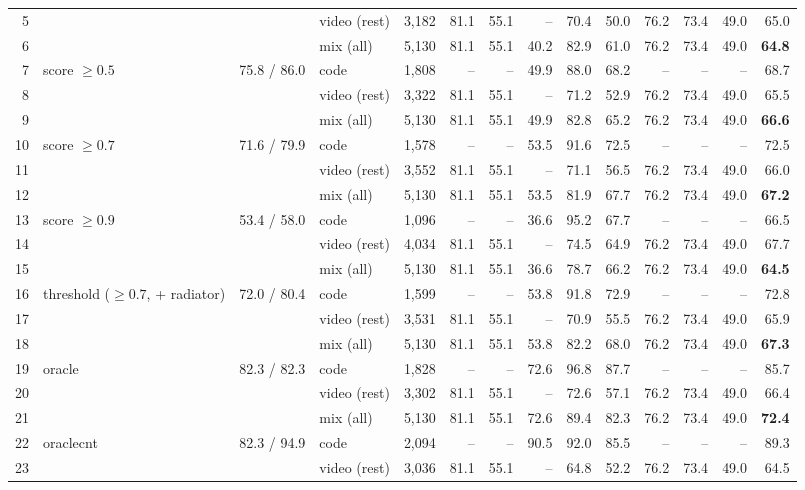 \begin{table}[h]
{\begin{tabular}{rlrlrrrrrrrrrr}
5 &  &  & video (rest) & 3,182 & 81.1 & 55.1 & -- & 70.4 & 50.0 & 76.2 & 73.4 & 49.0 & 65.0 \\
6 &  &  & mix (all) & 5,130 & 81.1 & 55.1 & 40.2 & 82.9 & 61.0 & 76.2 & 73.4 & 49.0 & \textbf{64.8} \\
7 & score $\geq 0.5$ & 75.8 / 86.0 & code & 1,808 & -- & -- & 49.9 & 88.0 & 68.2 & -- & -- & -- & 68.7 \\
8 &  &  & video (rest) & 3,322 & 81.1 & 55.1 & -- & 71.2 & 52.9 & 76.2 & 73.4 & 49.0 & 65.5 \\
9 &  &  & mix (all) & 5,130 & 81.1 & 55.1 & 49.9 & 82.8 & 65.2 & 76.2 & 73.4 & 49.0 & \textbf{66.6} \\
10 & score $\geq 0.7$ & 71.6 / 79.9 & code & 1,578 & -- & -- & 53.5 & 91.6 & 72.5 & -- & -- & -- & 72.5 \\
11 &  &  & video (rest) & 3,552 & 81.1 & 55.1 & -- & 71.1 & 56.5 & 76.2 & 73.4 & 49.0 & 66.0 \\
12 &  &  & mix (all) & 5,130 & 81.1 & 55.1 & 53.5 & 81.9 & 67.7 & 76.2 & 73.4 & 49.0 & \textbf{67.2} \\
13 & score $\geq 0.9$ & 53.4 / 58.0 & code & 1,096 & -- & -- & 36.6 & 95.2 & 67.7 & -- & -- & -- & 66.5 \\
14 &  &  & video (rest) & 4,034 & 81.1 & 55.1 & -- & 74.5 & 64.9 & 76.2 & 73.4 & 49.0 & 67.7 \\
15 &  &  & mix (all) & 5,130 & 81.1 & 55.1 & 36.6 & 78.7 & 66.2 & 76.2 & 73.4 & 49.0 & \textbf{64.5} \\
\midrule
16 & threshold ($\geq 0.7$, + radiator) & 72.0 / 80.4 & code & 1,599 & -- & -- & 53.8 & 91.8 & 72.9 & -- & -- & -- & 72.8 \\
17 &  &  & video (rest) & 3,531 & 81.1 & 55.1 & -- & 70.9 & 55.5 & 76.2 & 73.4 & 49.0 & 65.9 \\
18 &  &  & mix (all) & 5,130 & 81.1 & 55.1 & 53.8 & 82.2 & 68.0 & 76.2 & 73.4 & 49.0 & \textbf{67.3} \\
\midrule
19 & oracle & 82.3 / 82.3 & code & 1,828 & -- & -- & 72.6 & 96.8 & 87.7 & -- & -- & -- & 85.7 \\
20 &  &  & video (rest) & 3,302 & 81.1 & 55.1 & -- & 72.6 & 57.1 & 76.2 & 73.4 & 49.0 & 66.4 \\
21 &  &  & mix (all) & 5,130 & 81.1 & 55.1 & 72.6 & 89.4 & 82.3 & 76.2 & 73.4 & 49.0 & \textbf{72.4} \\
\midrule
22 & oraclecnt & 82.3 / 94.9 & code & 2,094 & -- & -- & 90.5 & 92.0 & 85.5 & -- & -- & -- & 89.3 \\
23 &  &  & video (rest) & 3,036 & 81.1 & 55.1 & -- & 64.8 & 52.2 & 76.2 & 73.4 & 49.0 & 64.5 \\

\end{tabular}}
\end{table}
